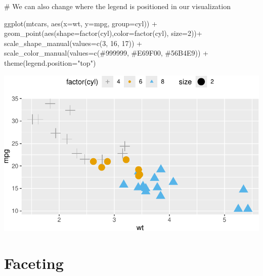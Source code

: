 \documentclass[
  letterpaper,
  DIV=11,
  numbers=noendperiod]{scrreprt}
\newenvironment{Shaded}{\begin{snugshade}}{\end{snugshade}}
\newcommand{\AttributeTok}[1]{\textcolor[rgb]{0.40,0.45,0.13}{#1}}
\newcommand{\CommentTok}[1]{\textcolor[rgb]{0.37,0.37,0.37}{#1}}
\newcommand{\DecValTok}[1]{\textcolor[rgb]{0.68,0.00,0.00}{#1}}
\newcommand{\FunctionTok}[1]{\textcolor[rgb]{0.28,0.35,0.67}{#1}}
\newcommand{\NormalTok}[1]{\textcolor[rgb]{0.00,0.23,0.31}{#1}}
\newcommand{\SpecialCharTok}[1]{\textcolor[rgb]{0.37,0.37,0.37}{#1}}
\newcommand{\StringTok}[1]{\textcolor[rgb]{0.13,0.47,0.30}{#1}}
\begin{document}
\begin{Shaded}
\begin{Highlighting}[]
\CommentTok{\# We can also change where the legend is positioned in our visualization}

\FunctionTok{ggplot}\NormalTok{(mtcars, }\FunctionTok{aes}\NormalTok{(}\AttributeTok{x=}\NormalTok{wt, }\AttributeTok{y=}\NormalTok{mpg, }\AttributeTok{group=}\NormalTok{cyl)) }\SpecialCharTok{+}
  \FunctionTok{geom\_point}\NormalTok{(}\FunctionTok{aes}\NormalTok{(}\AttributeTok{shape=}\FunctionTok{factor}\NormalTok{(cyl),}\AttributeTok{color=}\FunctionTok{factor}\NormalTok{(cyl), }\AttributeTok{size=}\DecValTok{2}\NormalTok{))}\SpecialCharTok{+}
  \FunctionTok{scale\_shape\_manual}\NormalTok{(}\AttributeTok{values=}\FunctionTok{c}\NormalTok{(}\DecValTok{3}\NormalTok{, }\DecValTok{16}\NormalTok{, }\DecValTok{17}\NormalTok{)) }\SpecialCharTok{+}
  \FunctionTok{scale\_color\_manual}\NormalTok{(}\AttributeTok{values=}\FunctionTok{c}\NormalTok{(}\StringTok{\textquotesingle{}\#999999\textquotesingle{}}\NormalTok{, }\StringTok{\textquotesingle{}\#E69F00\textquotesingle{}}\NormalTok{, }\StringTok{\textquotesingle{}\#56B4E9\textquotesingle{}}\NormalTok{)) }\SpecialCharTok{+}
  \FunctionTok{theme}\NormalTok{(}\AttributeTok{legend.position=}\StringTok{"top"}\NormalTok{)}
\end{Highlighting}
\end{Shaded}

\includegraphics{Advanced_Scatterplot_Techniques_files/figure-pdf/unnamed-chunk-12-1.pdf}

\section*{Faceting}\label{faceting}
\end{document}
